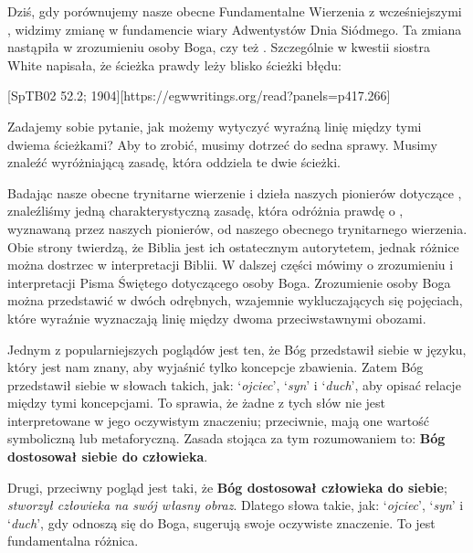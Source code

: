 
Dziś, gdy porównujemy nasze obecne Fundamentalne Wierzenia z wcześniejszymi , widzimy zmianę w fundamencie wiary Adwentystów Dnia Siódmego. Ta zmiana nastąpiła w zrozumieniu osoby Boga, czy też . Szczególnie w kwestii  siostra White napisała, że ścieżka prawdy leży blisko ścieżki błędu:

[SpTB02 52.2; 1904][https://egwwritings.org/read?panels=p417.266]

Zadajemy sobie pytanie, jak możemy wytyczyć wyraźną linię między tymi dwiema ścieżkami? Aby to zrobić, musimy dotrzeć do sedna sprawy. Musimy znaleźć wyróżniającą zasadę, która oddziela te dwie ścieżki.

Badając nasze obecne trynitarne wierzenie i dzieła naszych pionierów dotyczące , znaleźliśmy jedną charakterystyczną zasadę, która odróżnia prawdę o , wyznawaną przez naszych pionierów, od naszego obecnego trynitarnego wierzenia. Obie strony twierdzą, że Biblia jest ich ostatecznym autorytetem, jednak różnice można dostrzec w interpretacji Biblii. W dalszej części mówimy o zrozumieniu i interpretacji Pisma Świętego dotyczącego osoby Boga. Zrozumienie osoby Boga można przedstawić w dwóch odrębnych, wzajemnie wykluczających się pojęciach, które wyraźnie wyznaczają linię między dwoma przeciwstawnymi obozami.

Jednym z popularniejszych poglądów jest ten, że Bóg przedstawił siebie w języku, który jest nam znany, aby wyjaśnić tylko koncepcje zbawienia. Zatem Bóg przedstawił siebie w słowach takich, jak: ‘\textit{ojciec}’, ‘\textit{syn}’ i ‘\textit{duch}’, aby opisać relacje między tymi koncepcjami. To sprawia, że żadne z tych słów nie jest interpretowane w jego oczywistym znaczeniu; przeciwnie, mają one wartość symboliczną lub metaforyczną. Zasada stojąca za tym rozumowaniem to: \textbf{Bóg dostosował siebie do człowieka}.

Drugi, przeciwny pogląd jest taki, że \textbf{Bóg dostosował człowieka do siebie}; \textit{stworzył człowieka na swój własny obraz}. Dlatego słowa takie, jak: ‘\textit{ojciec}’, ‘\textit{syn}’ i ‘\textit{duch}’, gdy odnoszą się do Boga, sugerują swoje oczywiste znaczenie. To jest fundamentalna różnica.

